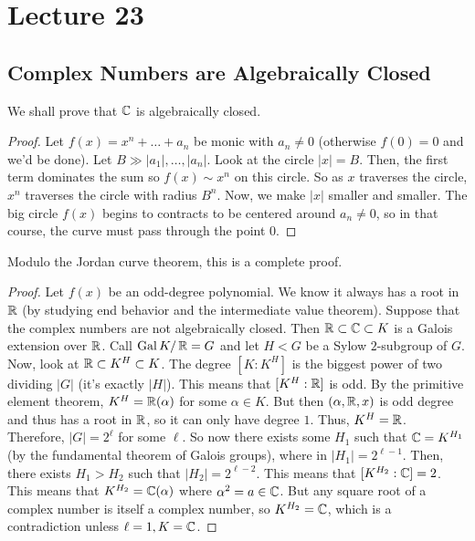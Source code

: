 \section{Lecture 23}
\subsection{Complex Numbers are Algebraically Closed}
We shall prove that $\operatorname{\mathbb{C}}$ is algebraically closed.
\begin{proof}
    Let $f(x) = x^n + \dots + a_n$ be monic with $a_n \neq 0$ (otherwise $f(0) = 0$ and we'd be done). Let $B \gg |a_1|, \dots, |a_n|$.
    Look at the circle $|x| = B$. Then, the first term dominates the sum
    so $f(x) \sim x^n$ on this circle.
    So as $x$ traverses the circle, $x^n$ traverses the circle with radius $B^n$.
    Now, we make $|x|$ smaller and smaller. The big circle $f(x)$ begins to contracts
    to be centered around $a_n \neq 0$, so in that course, the curve must pass through the point $0$.
\end{proof}
Modulo the Jordan curve theorem, this is a complete proof.
\begin{proof}
    Let $f(x)$ be an odd-degree polynomial. We know it always has a root in $\operatorname{\mathbb{R}}$
    (by studying end behavior and the intermediate value theorem).
    Suppose that the complex numbers are not algebraically closed.
    Then $\operatorname{\mathbb{R}} \subset \operatorname{\mathbb{C}} \subset K$ is a Galois extension over $\operatorname{\mathbb{R}}$.
    Call $\operatorname{Gal} K/\operatorname{\mathbb{R}} = G$ and let
    $H < G$ be a Sylow $2$-subgroup of $G$. Now, look at $\operatorname{\mathbb{R}} \subset K^H \subset K$.
    The degree $[K : K^H]$ is the biggest power of two dividing $|G|$ (it's exactly $|H|$). This means that $[K^H : \operatorname{\mathbb{R}}]$
    is odd. By the primitive element theorem, $K^H = \operatorname{\mathbb{R}}(\alpha)$ for some $\alpha \in K$.
    But then $(\alpha, \operatorname{\mathbb{R}}, x)$ is odd degree
    and thus has a root in $\operatorname{\mathbb{R}}$, so it can only have degree $1$. Thus, $K^H = \operatorname{\mathbb{R}}$.
    Therefore, $|G| = 2^{\ell}$ for some $\ell$. So now there exists some $H_1$
    such that $\operatorname{\mathbb{C}} = K^{H_1}$ (by the
    fundamental theorem of Galois groups), where in $|H_1| = 2^{\ell - 1}$.
    Then, there exists $H_1 > H_2$ such that $|H_2| = 2^{\ell - 2}$. This means that
    $[K^{H_2} : \operatorname{\mathbb{C}}] = 2$. This means that $K^{H_2} = \operatorname{\mathbb{C}}(\alpha)$ where $\alpha^2 = a \in \operatorname{\mathbb{C}}$.
    But any square root of a complex number is itself a complex number, so $K^{H_2} = \operatorname{\mathbb{C}}$,
    which is a contradiction unless $\ell = 1, K = \operatorname{\mathbb{C}}$.
\end{proof}

